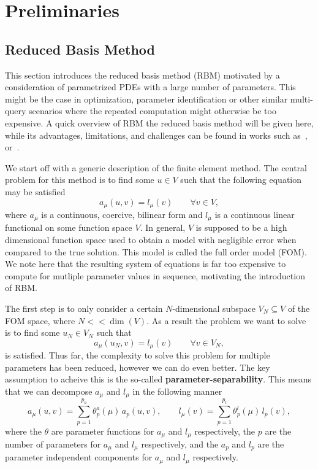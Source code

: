 \section{Preliminaries}


\subsection{Reduced Basis Method}

This section introduces the reduced basis method (RBM) motivated by a consideration of parametrized PDEs with a large number of parameters.
This might be the case in optimization, parameter identification or other similar multi-query scenarios where the repeated computation might otherwise be too expensive.
A quick overview of RBM the reduced basis method will be given here, while its advantages, limitations, and challenges can be found in works such as~\cite{Ohlberger2015},~\cite{Quarteroni2015} or~\cite{Hesthaven2016}.

We start off with a generic description of the finite element method.
The central problem for this method is to find some $u \in V$ such that the following equation may be satisfied
\begin{equation}\label{FOMEq}
    a_\mu(u, v) = l_\mu(v) \qquad \forall v \in V,
\end{equation}
where $a_\mu$ is a continuous, coercive, bilinear form and $l_\mu$ is a continuous linear functional on some function space $V$.
In general, $V$ is supposed to be a high dimensional function space used to obtain a model with negligible error when compared to the true solution.
This model is called the full order model (FOM).
We note here that the resulting system of equations is far too expensive to compute for mutliple parameter values in sequence, motivating the introduction of RBM.\@

The first step is to only consider a certain $N$-dimensional subspace $V_N \subseteq V$ of the FOM space, where $N << \dim(V)$.
As a result the problem we want to solve is to find some $u_N \in V_N$ such that
\begin{equation}\label{ROMEq}
    a_\mu(u_N, v) = l_\mu(v) \qquad \forall v \in V_N,
\end{equation}
is satisfied.
Thus far, the complexity to solve this problem for multiple parameters has been reduced, however we can do even better.
The key assumption to acheive this is the so-called \textbf{parameter-separability}.
This means that we can decompose $a_\mu$ and $l_\mu$ in the following manner
\begin{equation}\label{ParamSep}
    a_\mu(u, v) = \sum\limits_{p = 1}^{p_a} \theta_p^a(\mu) \, a_p(u, v), \qquad l_\mu(v) = \sum\limits_{p = 1}^{p_l} \theta_p^l(\mu) \, l_p(v),
\end{equation}
where the $\theta$ are parameter functions for $a_\mu$ and $l_\mu$ respectively, the $p$ are the number of parameters for $a_\mu$ and $l_\mu$ respectively, and the $a_p$ and $l_p$ are the parameter independent components for $a_\mu$ and $l_\mu$ respectively.

